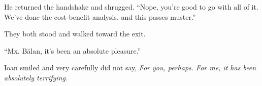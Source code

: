 He returned the handshake and shrugged. ``Nope, you're good to go with all of it. We've done the cost-benefit analysis, and this passes muster.''

They both stood and walked toward the exit.

``Mx. Bălan, it's been an absolute pleasure.''

Ioan smiled and very carefully did not say, \emph{For you, perhaps. For me, it has been absolutely terrifying.}
